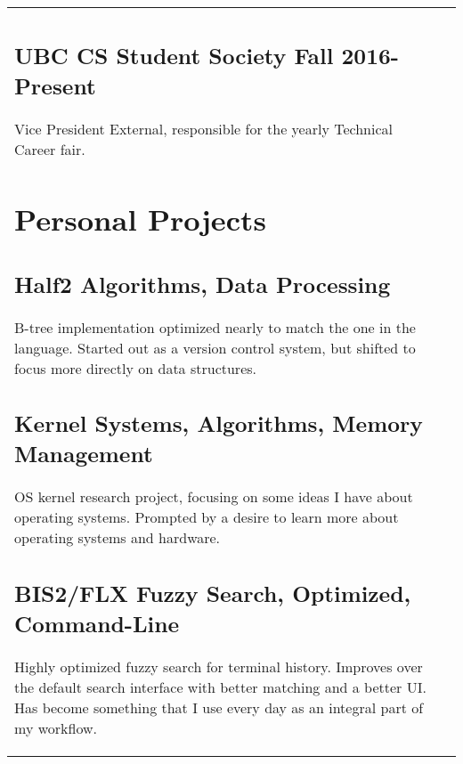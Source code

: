 \documentclass[letterpaper]{article}
\newlength{\leftcol}
\newlength{\rightcol}
\newcommand{\subtitle}{\normalfont\sffamily\color{black}\large}
\begin{document}
\begin{tabularx}{\textwidth}{@{}p{\leftcol} p{\rightcol}}
\subsection*{UBC CS Student Society \subtitle \hfill Fall 2016-Present}

Vice President External, responsible for the yearly Technical Career fair.


\section*{Personal Projects}

\subsection*{Half2 \subtitle \hfill Algorithms, Data Processing}

B-tree implementation optimized nearly to match the one in the language. Started
out as a version control system, but shifted to focus more directly on data
structures.

\subsection*{Kernel \subtitle \hfill Systems, Algorithms, Memory Management}

OS kernel research project, focusing on some ideas I have about operating
systems. Prompted by a desire to learn more about operating systems and
hardware.

\subsection*{BIS2/FLX \subtitle \hfill Fuzzy Search, Optimized, Command-Line}

Highly optimized fuzzy search for terminal history. Improves over the default
search interface with better matching and a better UI. Has become something that
I use every day as an integral part of my workflow.
\end{tabularx}
\end{document}
